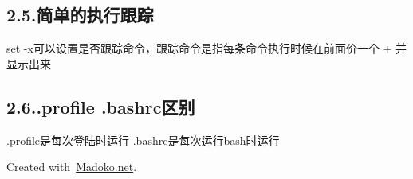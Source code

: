 \documentclass{article}
\begin{document}
\subsection{2.5.\hspace*{0.5em}简单的执行跟踪}\label{section}%

\noindent set -x可以设置是否跟踪命令，跟踪命令是指每条命令执行时候在前面价一个 + 并显示出来%

\subsection{2.6.\hspace*{0.5em}.profile .bashrc区别}\label{sec-profile-bashrc}%

\noindent.profile是每次登陆时运行\mdbr
.bashrc是每次运行bash时运行%

\begin{mdbmargintb}{4em}{}%
\begin{mdflushright}%
{\tiny Created with~\href{https://www.madoko.net}{Madoko.net}.}%
\end{mdflushright}%
\end{mdbmargintb}%
\end{document}
